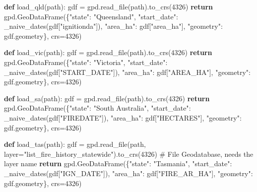 \documentclass[
  letterpaper,
  DIV=11,
  numbers=noendperiod]{scrartcl}
\newenvironment{Shaded}{\begin{snugshade}}{\end{snugshade}}
\newcommand{\CommentTok}[1]{\textcolor[rgb]{0.37,0.37,0.37}{#1}}
\newcommand{\ControlFlowTok}[1]{\textcolor[rgb]{0.00,0.23,0.31}{\textbf{#1}}}
\newcommand{\DecValTok}[1]{\textcolor[rgb]{0.68,0.00,0.00}{#1}}
\newcommand{\KeywordTok}[1]{\textcolor[rgb]{0.00,0.23,0.31}{\textbf{#1}}}
\newcommand{\NormalTok}[1]{\textcolor[rgb]{0.00,0.23,0.31}{#1}}
\newcommand{\OperatorTok}[1]{\textcolor[rgb]{0.37,0.37,0.37}{#1}}
\newcommand{\StringTok}[1]{\textcolor[rgb]{0.13,0.47,0.30}{#1}}
\begin{document}
\begin{Shaded}
\begin{Highlighting}[]
\KeywordTok{def}\NormalTok{ load\_qld(path):}
\NormalTok{    gdf }\OperatorTok{=}\NormalTok{ gpd.read\_file(path).to\_crs(}\DecValTok{4326}\NormalTok{)}
    \ControlFlowTok{return}\NormalTok{ gpd.GeoDataFrame(\{}\StringTok{"state"}\NormalTok{: }\StringTok{"Queensland"}\NormalTok{, }\StringTok{"start\_date"}\NormalTok{: \_naive\_dates(gdf[}\StringTok{"ignitionda"}\NormalTok{]),}
                              \StringTok{"area\_ha"}\NormalTok{: gdf[}\StringTok{"area\_ha"}\NormalTok{], }\StringTok{"geometry"}\NormalTok{: gdf.geometry\}, crs}\OperatorTok{=}\DecValTok{4326}\NormalTok{)}

\KeywordTok{def}\NormalTok{ load\_vic(path):}
\NormalTok{    gdf }\OperatorTok{=}\NormalTok{ gpd.read\_file(path).to\_crs(}\DecValTok{4326}\NormalTok{)}
    \ControlFlowTok{return}\NormalTok{ gpd.GeoDataFrame(\{}\StringTok{"state"}\NormalTok{: }\StringTok{"Victoria"}\NormalTok{, }\StringTok{"start\_date"}\NormalTok{: \_naive\_dates(gdf[}\StringTok{"START\_DATE"}\NormalTok{]),}
                              \StringTok{"area\_ha"}\NormalTok{: gdf[}\StringTok{"AREA\_HA"}\NormalTok{], }\StringTok{"geometry"}\NormalTok{: gdf.geometry\}, crs}\OperatorTok{=}\DecValTok{4326}\NormalTok{)}

\KeywordTok{def}\NormalTok{ load\_sa(path):}
\NormalTok{    gdf }\OperatorTok{=}\NormalTok{ gpd.read\_file(path).to\_crs(}\DecValTok{4326}\NormalTok{)}
    \ControlFlowTok{return}\NormalTok{ gpd.GeoDataFrame(\{}\StringTok{"state"}\NormalTok{: }\StringTok{"South Australia"}\NormalTok{, }\StringTok{"start\_date"}\NormalTok{: \_naive\_dates(gdf[}\StringTok{"FIREDATE"}\NormalTok{]),}
                              \StringTok{"area\_ha"}\NormalTok{: gdf[}\StringTok{"HECTARES"}\NormalTok{], }\StringTok{"geometry"}\NormalTok{: gdf.geometry\}, crs}\OperatorTok{=}\DecValTok{4326}\NormalTok{)}

\KeywordTok{def}\NormalTok{ load\_tas(path):}
\NormalTok{    gdf }\OperatorTok{=}\NormalTok{ gpd.read\_file(path, layer}\OperatorTok{=}\StringTok{"list\_fire\_history\_statewide"}\NormalTok{).to\_crs(}\DecValTok{4326}\NormalTok{)  }\CommentTok{\# File Geodatabase, needs the layer name}
    \ControlFlowTok{return}\NormalTok{ gpd.GeoDataFrame(\{}\StringTok{"state"}\NormalTok{: }\StringTok{"Tasmania"}\NormalTok{, }\StringTok{"start\_date"}\NormalTok{: \_naive\_dates(gdf[}\StringTok{"IGN\_DATE"}\NormalTok{]),}
                              \StringTok{"area\_ha"}\NormalTok{: gdf[}\StringTok{"FIRE\_AR\_HA"}\NormalTok{], }\StringTok{"geometry"}\NormalTok{: gdf.geometry\}, crs}\OperatorTok{=}\DecValTok{4326}\NormalTok{)}


\end{Highlighting}
\end{Shaded}
\end{document}

